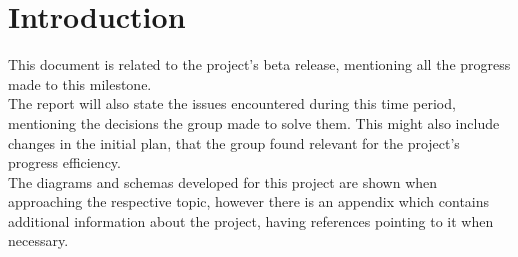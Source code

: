 %
%

\chapter{Introduction}

This document is related to the project's beta release, mentioning all the progress made to this milestone.\\

The report will also state the issues encountered during this time period, mentioning the 
decisions the group made to solve them. This might also include changes in the
initial plan, that the group found relevant for the project's progress efficiency.\\

The diagrams and schemas developed for this project are shown when approaching the respective topic,
however there is an appendix which contains additional information about the project, having 
references pointing to it when necessary.